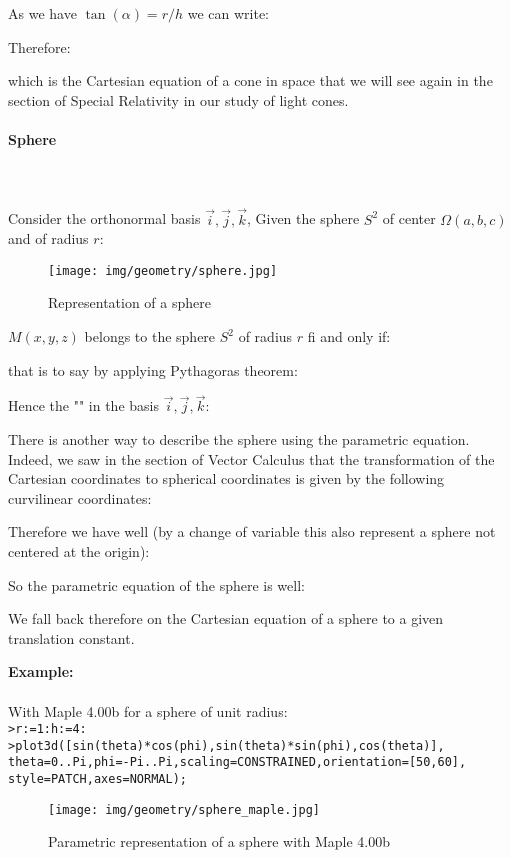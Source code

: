 {	As we have $\tan(\alpha)=r/h$ we can write:
	
	Therefore:
	
	which is the Cartesian equation of a cone in space that we will see again in the section of Special Relativity in our study of light cones.
	
	\paragraph{Sphere}\label{sphere}\mbox{}\\\\
	Consider the orthonormal basis ${\vec{i},\vec{j},\vec{k}}$, Given the sphere $S^2$ of  center $\Omega(a,b,c)$ and of radius $r$:
	\begin{figure}[H]
		\centering
		\texttt{[image: img/geometry/sphere.jpg]}
		\caption{Representation of a sphere}
	\end{figure}
	$M(x,y,z)$ belongs to the sphere  $S^2$ of radius $r$ fi and only if:
	
	that is to say by applying Pythagoras theorem:
	
	Hence the "" in the basis ${\vec{i},\vec{j},\vec{k}}$:
	
	There is another way to describe the sphere using the parametric equation. Indeed, we saw in the section of Vector Calculus that the transformation of the Cartesian coordinates to spherical coordinates is given by the following curvilinear coordinates:
	
	Therefore we have well (by a change of variable this also represent a sphere not centered at the origin):
	
	So the parametric equation of the sphere is well:
	
	We fall back therefore on the Cartesian equation of a sphere to a given translation constant.
	\begin{tcolorbox}[colframe=black,colback=white,sharp corners]
	\textbf{{\Large {}}Example:}\\\\
	With Maple 4.00b for a sphere of unit radius:\\

	\texttt{>r:=1:h:=4:\\
>plot3d([sin(theta)*cos(phi),sin(theta)*sin(phi),cos(theta)],\\
theta=0..Pi,phi=-Pi..Pi,scaling=CONSTRAINED,orientation=[50,60],\\
style=PATCH,axes=NORMAL);
	}
	\begin{figure}[H]
		\centering
		\texttt{[image: img/geometry/sphere\_maple.jpg]}
		\caption{Parametric representation of a sphere with Maple 4.00b}
	\end{figure}
	\end{tcolorbox}
	
}
